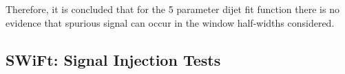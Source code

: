 Therefore, it is concluded that for the 5 parameter dijet fit function there is no evidence that spurious signal can occur in the window half-widths considered.

%

\FloatBarrier

\subsection{SWiFt: Signal Injection Tests}
\label{sec:bkg-full_signalInj}

